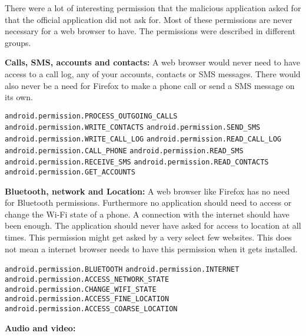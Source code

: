 \newpage
There were a lot of interesting permission that the malicious application asked for that the official application did not ask for. Most of these permissions are never necessary for a web browser to have. The permissions were described in different groups.

\textbf{Calls, SMS, accounts and contacts:}
A web browser would never need to have access to a call log, any of your accounts, contacts or SMS messages. There would also never be a need for Firefox to make a phone call or send a SMS message on its own.

\texttt{android.permission.PROCESS\_OUTGOING\_CALLS}
\newline \texttt{android.permission.WRITE\_CONTACTS}
\newline \texttt{android.permission.SEND\_SMS}
\newline \texttt{android.permission.WRITE\_CALL\_LOG}
\newline \texttt{android.permission.READ\_CALL\_LOG}
\newline \texttt{android.permission.CALL\_PHONE}
\newline \texttt{android.permission.READ\_SMS}
\newline \texttt{android.permission.RECEIVE\_SMS}
\newline \texttt{android.permission.READ\_CONTACTS}
\newline \texttt{android.permission.GET\_ACCOUNTS}

\textbf{Bluetooth, network and Location:}
A web browser like Firefox has no need for Bluetooth permissions. Furthermore no application should need to access or change the Wi-Fi state of a phone. A connection with the internet should have been enough. The application should never have asked for access to location at all times. This permission might get asked by a very select few websites. This does not mean a internet browser needs to have this permission when it gets installed. 

\texttt{android.permission.BLUETOOTH}
\newline \texttt{android.permission.INTERNET}
\newline \texttt{android.permission.ACCESS\_NETWORK\_STATE}
\newline \texttt{android.permission.CHANGE\_WIFI\_STATE}
\newline \texttt{android.permission.ACCESS\_FINE\_LOCATION}
\newline \texttt{android.permission.ACCESS\_COARSE\_LOCATION}

\textbf{Audio and video:}

